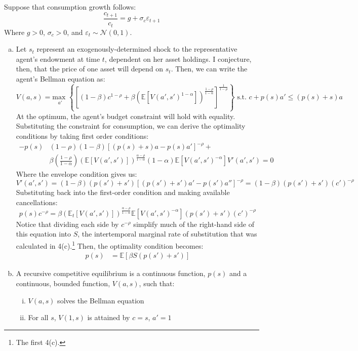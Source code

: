 \documentclass{article}
\newcommand{\usmax}[1]{\underset{#1}{\text{max }}}
\newcommand{\N}{\mathcal{N}}
\newcommand{\E}[1]{\mathbb{E}\left[#1\right]} %
\newcommand{\Et}[1]{\mathbb{E}_t\left[#1\right]}
\begin{document}
\begin{enumerate}[(a)]
\end{enumerate}
Suppose that consumption growth follows:
\[
	\frac{c_{t+1}}{c_{t}} = g + \sigma_c\varepsilon_{t+1}
\]
Where ${g>0}$, ${\sigma_c>0}$, and ${\varepsilon_t\sim\N(0,1)}$.
\begin{enumerate}[(a)]
	\item Let $s_t$ represent an exogenously-determined shock to the representative agent's endowment at time $t$, dependent on her asset holdings. I conjecture, then, that the price of one asset will depend on $s_t$. Then, we can write the agent's Bellman equation as:
	{\small
		\[
			V(a,s) = \usmax{a'}\left\{\left[(1-\beta)c^{1-\rho}  + \beta\left(\E{V(a',s')^{1-\alpha}}\right)^{\frac{1-\rho}{1-\alpha}}\right]^{\frac{1}{1-\rho}}\right\}\text{ s.t. } c + p(s)a' \leq (p(s) + s)a
		\]
	}%
		At the optimum, the agent's budget constraint will hold with equality. Substituting the constraint for consumption, we can derive the optimality conditions by taking first order conditions:
		\begin{align*}
			-p(s)&(1-\rho)(1-\beta)\left[(p(s) + s)a-p(s)a'\right]^{-\rho} + 	\\
				&\beta\left(\frac{1-\rho}{1-\alpha}\right)\left(\E{V(a',s')}\right)^{\frac{\alpha-\rho}{1-\alpha}}(1-\alpha)\E{V(a',s')^{-\alpha}}V'(a',s') = 0
		\end{align*}
		Where the envelope condition gives us:
		\[
			V'(a',s') = (1-\beta)(p(s')+s')\left[(p(s') + s')a'-p(s')a''\right]^{-\rho}=(1-\beta)(p(s')+s')(c')^{-\rho}
		\]
		Substituting back into the first-order condition and making available cancellations:
		\[
		 p(s)c^{-\rho} = \beta\left(\Et{V(a',s')}\right)^{\frac{\alpha-\rho}{1-\alpha}}\E{V(a',s')^{-\alpha}}(p(s')+s')(c')^{-\rho} 
		\]
		Notice that dividing each side by $c^{-\rho}$ simplify much of the right-hand side of this equation into $S$, the intertemporal marginal rate of substitution that was calculated in 4(c).\footnote{The first 4(c).} Then, the optimality condition becomes:
		\begin{align*}
			p(s) &= \E{\beta S(p(s')+s')}
		\end{align*}
		
	\item A recursive competitive equilibrium is a continuous function, $p(s)$ and a continuous, bounded function, $V(a,s)$, such that:
		\begin{enumerate}[(i)]
			\item $V(a,s)$ solves the Bellman equation 
			\item For all $s$, $V(1,s)$ is attained by ${c=s}$, ${a'=1}$
		\end{enumerate}
	

\end{enumerate}
\end{document}
